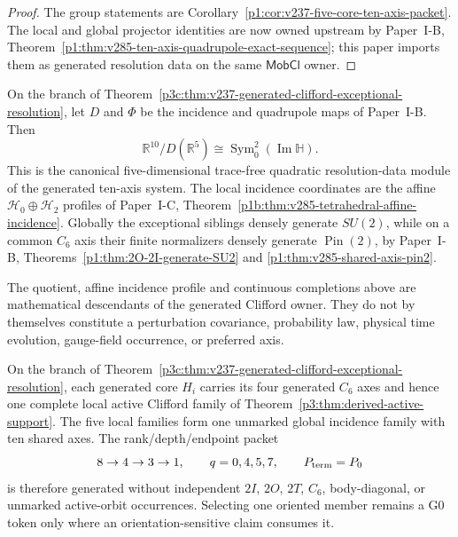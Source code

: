 \documentclass[12pt,a4paper]{article}
\begin{document}
\begin{proof}
The group statements are Corollary~\ref{p1:cor:v237-five-core-ten-axis-packet}.
The local and global projector identities are now owned upstream by
Paper~I-B, Theorem~\ref{p1:thm:v285-ten-axis-quadrupole-exact-sequence}; this
paper imports them as generated resolution data on the same
\(\mathsf{MobCl}\) owner.
\end{proof}

\begin{corollary}
\label{p3c:cor:v285-ten-axis-quadrupole-resolution}
On the branch of Theorem~\ref{p3c:thm:v237-generated-clifford-exceptional-resolution},
let \(D\) and \(\Phi\) be the incidence and quadrupole maps of Paper~I-B.
Then
\[
 \boxed{\mathbb R^{10}/D(\mathbb R^5)
 \cong\operatorname{Sym}^2_0(\operatorname{Im}\mathbb H).}
\]
This is the canonical five-dimensional trace-free quadratic resolution-data
module of the generated ten-axis system.  The local incidence coordinates are
the affine \(\mathcal H_0\oplus\mathcal H_2\) profiles of
Paper~I-C, Theorem~\ref{p1b:thm:v285-tetrahedral-affine-incidence}.  Globally
the exceptional siblings densely generate \(SU(2)\), while on a common
\(C_6\) axis their finite normalizers densely generate
\(\operatorname{Pin}(2)\), by Paper~I-B,
Theorems~\ref{p1:thm:2O-2I-generate-SU2} and
\ref{p1:thm:v285-shared-axis-pin2}.
\end{corollary}

\begin{remark}
The quotient, affine incidence profile and continuous completions above are
mathematical descendants of the generated Clifford owner.  They do not by
themselves constitute a perturbation covariance, probability law, physical
time evolution, gauge-field occurrence, or preferred axis.
\end{remark}

\begin{corollary}
\label{p3c:cor:v237-mobile-active-family-ancestry}
On the branch of Theorem~\ref{p3c:thm:v237-generated-clifford-exceptional-resolution},
each generated core \(H_i\) carries its four generated \(C_6\) axes and hence
one complete local active Clifford family of
Theorem~\ref{p3:thm:derived-active-support}.  The five local families form one
unmarked global incidence family with ten shared axes.  The rank/depth/endpoint
packet
\[
 8\to4\to3\to1,\qquad q=0,4,5,7,\qquad P_{\rm term}=P_0
\]
is therefore generated without independent \(2I\), \(2O\), \(2T\), \(C_6\),
body-diagonal, or unmarked active-orbit occurrences.  Selecting one oriented
member remains a G0 token only where an orientation-sensitive claim consumes it.
\end{corollary}
\end{document}
